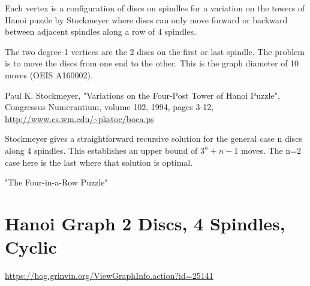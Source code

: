 \documentclass{article}
\begin{document}
Each vertex is a configuration of discs on spindles for a variation on the towers of Hanoi puzzle by Stockmeyer where discs can only move forward or backward between adjacent spindles along a row of 4 spindles.

The two degree-1 vertices are the 2 discs on the first or last
spindle.  The problem is to move the discs from one end to the other.
This is the graph diameter of 10 moves (OEIS A160002).

Paul K. Stockmeyer, "Variations on the Four-Post Tower of Hanoi
Puzzle", Congressus Numerantium, volume 102, 1994, pages 3-12,
\url{http://www.cs.wm.edu/~pkstoc/boca.ps}



Stockmeyer gives a straightforward recursive solution for the general case n discs along 4 spindles.  This establishes an upper bound of $3^n+n-1$ moves.  The n=2 case here is the last where that solution is optimal.

"The Four-in-a-Row Puzzle"

\section{Hanoi Graph 2 Discs, 4 Spindles, Cyclic}

\url{https://hog.grinvin.org/ViewGraphInfo.action?id=25141}

\begin{center}
\end{center}
\end{document}
